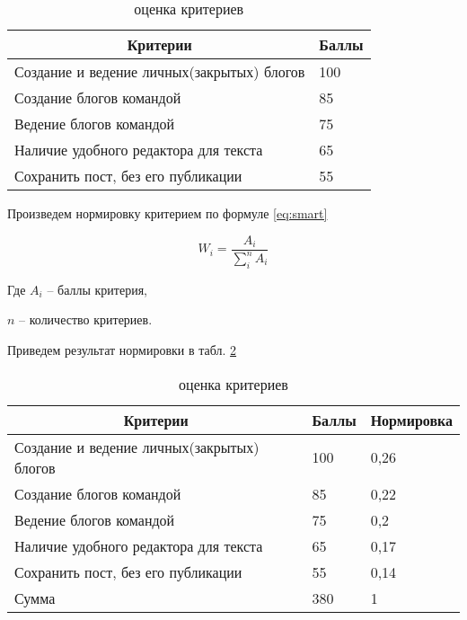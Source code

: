 \begin{table}[H]
	\caption{оценка критериев} 
	\label{tabular:samrt}
	\begin{center}
\begin{tabular}{|l|l|}
\hline
\multicolumn{1}{|c|}{Критерии}             & \multicolumn{1}{c|}{Баллы} \\ \hline
Создание и ведение личных(закрытых) блогов & 100                        \\ \hline
Создание блогов командой                   & 85                         \\ \hline
Ведение блогов командой                    & 75                         \\ \hline
Наличие удобного редактора для текста      & 65                         \\ \hline
Сохранить пост, без его публикации         & 55                         \\ \hline
\end{tabular}
	\end{center}
\end{table}

Произведем нормировку критерием по формуле \ref{eq:smart}

\begin{equation}\label{eq:smart}
W_i  = \frac{{A_i }}{{\sum\nolimits_i^n {A_i } }}
\end{equation}

Где $A_i$ -- баллы критерия,

$n$ -- количество критериев.

Приведем результат нормировки в табл. \ref{tabular:normirov}

\begin{table}[H]
	\caption{оценка критериев} 
	\label{tabular:normirov}
	\begin{center}
\begin{tabular}{|l|l|l|}
\hline
\multicolumn{1}{|c|}{Критерии}             & \multicolumn{1}{c|}{Баллы} & Нормировка \\ \hline
Создание и ведение личных(закрытых) блогов & 100                        & 0,26       \\ \hline
Создание блогов командой                   & 85                         & 0,22       \\ \hline
Ведение блогов командой                    & 75                         & 0,2        \\ \hline
Наличие удобного редактора для текста      & 65                         & 0,17       \\ \hline
Сохранить пост, без его публикации         & 55                         & 0,14       \\ \hline
Сумма                                      & 380                        & 1          \\ \hline
\end{tabular}
	\end{center}
\end{table}

